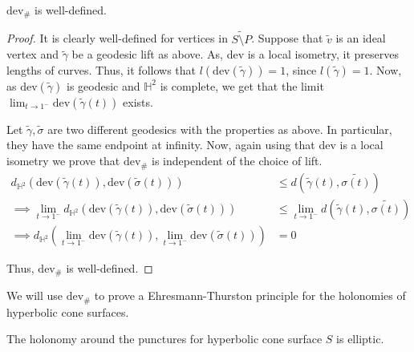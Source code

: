 \begin{prop}
	$\text{dev}_\#$ is well-defined.
\end{prop}

\begin{proof}
	It is clearly well-defined for vertices in $\widetilde{S \setminus P}$. Suppose that $\tilde{v}$ is an ideal vertex and $\tilde{\gamma}$ be a geodesic lift as above. As, dev is a local isometry, it preserves lengths of curves. Thus, it follows that $l(\text{dev}(\tilde{\gamma})) = 1$, since $l(\tilde{\gamma})=1$. Now, as $\text{dev}(\tilde{\gamma})$ is geodesic and $\mathbb{H}^2$ is complete, we get that the limit $\displaystyle \lim_{t \rightarrow 1^{-}} \text{dev}(\tilde{\gamma}(t))$ exists.
	
	Let $\tilde{\gamma}, \tilde{\sigma}$ are two different geodesics with the properties as above. In particular, they have the same endpoint at infinity. Now, again using that dev is a local isometry we prove that $\text{dev}_{\#}$ is independent of the choice of lift.
	\begin{align*}
	 d_{\mathbb{H}^2} \left(\text{dev}(\tilde{\gamma}(t)),\text{dev}(\tilde{\sigma}(t))\right)
		&\leq d(\tilde{\gamma}(t),\tilde{\sigma(t)}) \\
	\implies \displaystyle \lim_{t \rightarrow 1^{-}} d_{\mathbb{H}^2} \left(\text{dev}(\tilde{\gamma}(t)),\text{dev}(\tilde{\sigma}(t))\right) &\leq \displaystyle \lim_{t \rightarrow 1^{-}} d(\tilde{\gamma}(t),\tilde{\sigma(t)}) \\	\implies d_{\mathbb{H}^2} \left(\displaystyle \lim_{t \rightarrow 1^{-}}\text{dev}(\tilde{\gamma}(t)),\displaystyle \lim_{t \rightarrow 1^{-}}\text{dev}(\tilde{\sigma}(t))\right) &= 0
	\end{align*}
	
	Thus, $\text{dev}_{\#}$ is well-defined.
\end{proof}

We will use $\text{dev}_{\#}$ to prove a Ehresmann-Thurston principle for the holonomies of hyperbolic cone surfaces.

\begin{prop} \label{prop:holonomy_around_the _punctures}
	The holonomy around the punctures for hyperbolic cone surface $S$ is elliptic.
\end{prop}

